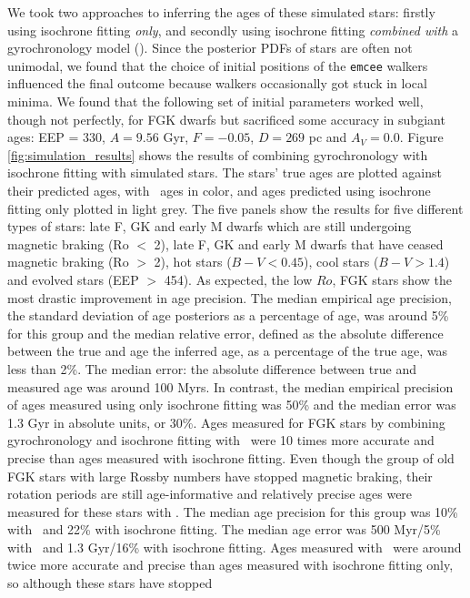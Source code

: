We took two approaches to inferring the ages of these simulated stars:
firstly using isochrone fitting {\it only}, and secondly using isochrone
fitting {\it combined with} a gyrochronology model (\sd).
Since the posterior PDFs of stars are often not unimodal, we found that the
choice of initial positions of the {\tt emcee} walkers influenced the final
outcome because walkers occasionally got stuck in local minima.
We found that the following set of initial parameters worked well, though not
perfectly, for FGK dwarfs but sacrificed some accuracy in subgiant ages: EEP =
330, $A = 9.56$ Gyr, $F = -0.05$, $D = 269$ pc and $A_V = 0.0$.
Figure \ref{fig:simulation_results} shows the results of combining
gyrochronology with isochrone fitting with simulated stars.
The stars' true ages are plotted against their predicted ages, with \sd\ ages
in color, and ages predicted using isochrone fitting only plotted in light
grey.
The five panels show the results for five different types of stars: late F, GK
and early M dwarfs which are still undergoing magnetic braking (Ro $<$ 2),
late F, GK and early M dwarfs that have ceased magnetic braking (Ro $>$ 2),
hot stars ($B-V < 0.45$), cool stars ($B-V > 1.4$) and evolved stars (EEP $>$
454).
As expected, the low $Ro$, FGK stars show the most drastic improvement in age
precision.
The median empirical age precision, the standard deviation of age posteriors
as a percentage of age, was around 5\% for this group and the median relative
error, defined as the absolute difference between the true and age the
inferred age, as a percentage of the true age, was less than 2\%.
The median error: the absolute difference between true and measured age was
around 100 Myrs.
In contrast, the median empirical precision of ages measured using only
isochrone fitting was 50\% and the median error was 1.3 Gyr in absolute units,
or 30\%.
Ages measured for FGK stars by combining gyrochronology and isochrone fitting
with \sd\ were 10 times more accurate and precise than ages measured with
isochrone fitting.
Even though the group of old FGK stars with large Rossby numbers have stopped
magnetic braking, their rotation periods are still age-informative and
relatively precise ages were measured for these stars with \sd.
The median age precision for this group was 10\% with \sd\ and 22\% with
isochrone fitting.
The median age error was 500 Myr/5\% with \sd\ and 1.3 Gyr/16\% with isochrone
fitting.
Ages measured with \sd\ were around twice more accurate and precise than ages
measured with isochrone fitting only, so although these stars have stopped
